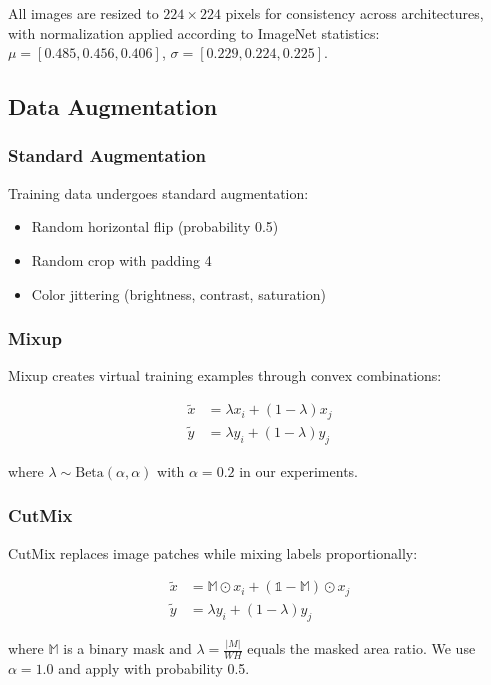All images are resized to $224 \times 224$ pixels for consistency across architectures, with normalization applied according to ImageNet statistics: $\mu = [0.485, 0.456, 0.406]$, $\sigma = [0.229, 0.224, 0.225]$.

\subsection{Data Augmentation}

\subsubsection{Standard Augmentation}

Training data undergoes standard augmentation:
\begin{itemize}
    \item Random horizontal flip (probability 0.5)
    \item Random crop with padding 4
    \item Color jittering (brightness, contrast, saturation)
\end{itemize}

\subsubsection{Mixup}

Mixup creates virtual training examples through convex combinations:

\begin{align}
\tilde{x} &= \lambda x_i + (1-\lambda) x_j \\
\tilde{y} &= \lambda y_i + (1-\lambda) y_j
\end{align}

where $\lambda \sim \text{Beta}(\alpha, \alpha)$ with $\alpha = 0.2$ in our experiments.

\subsubsection{CutMix}

CutMix replaces image patches while mixing labels proportionally:

\begin{align}
\tilde{x} &= \mathbb{M} \odot x_i + (\mathbb{1} - \mathbb{M}) \odot x_j \\
\tilde{y} &= \lambda y_i + (1-\lambda) y_j
\end{align}

where $\mathbb{M}$ is a binary mask and $\lambda = \frac{|M|}{WH}$ equals the masked area ratio. We use $\alpha = 1.0$ and apply with probability 0.5.

